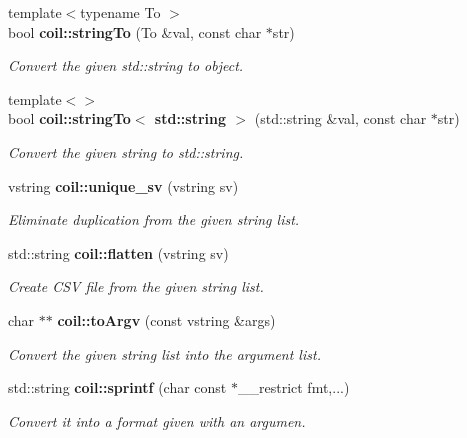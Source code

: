 \begin{DoxyCompactItemize}
{\footnotesize template$<$typename To $>$ }\\bool {\bf coil::stringTo} (To \&val, const char $\ast$str)
\begin{DoxyCompactList}\small\item\em Convert the given std::string to object. \item\end{DoxyCompactList}\item 
{\footnotesize template$<$$>$ }\\bool {\bf coil::stringTo$<$ std::string $>$} (std::string \&val, const char $\ast$str)
\begin{DoxyCompactList}\small\item\em Convert the given string to std::string. \item\end{DoxyCompactList}\item 
vstring {\bf coil::unique\_\-sv} (vstring sv)
\begin{DoxyCompactList}\small\item\em Eliminate duplication from the given string list. \item\end{DoxyCompactList}\item 
std::string {\bf coil::flatten} (vstring sv)
\begin{DoxyCompactList}\small\item\em Create CSV file from the given string list. \item\end{DoxyCompactList}\item 
char $\ast$$\ast$ {\bf coil::toArgv} (const vstring \&args)
\begin{DoxyCompactList}\small\item\em Convert the given string list into the argument list. \item\end{DoxyCompactList}\item 
std::string {\bf coil::sprintf} (char const $\ast$\_\-\_\-restrict fmt,...)
\begin{DoxyCompactList}\small\item\em Convert it into a format given with an argumen. \item\end{DoxyCompactList}\end{DoxyCompactItemize}
